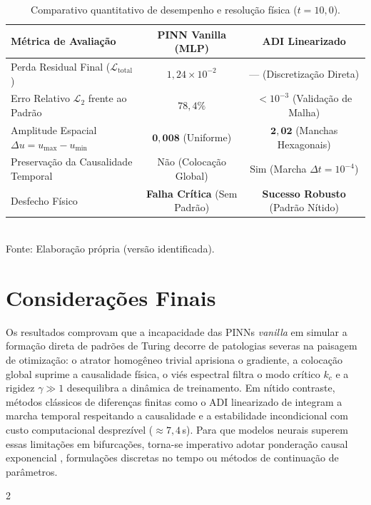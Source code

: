 \documentclass[a4paper, 12pt, twoside]{article}
\begin{document}
\begin{table}[!ht]
  \caption{Comparativo quantitativo de desempenho e resolução física ($t = 10{,}0$).}
  \label{tab:results_summary}
  \centering
  \small{}
  \begin{tabular}{lcc}
    \toprule
    \textbf{Métrica de Avaliação} & \textbf{PINN Vanilla (MLP)} & \textbf{ADI Linearizado \cite{pereira2019}} \\
    \midrule
    Perda Residual Final ($\mathcal{L}_{\mathrm{total}}$) & $1{,}24 \times 10^{-2}$ & --- (Discretização Direta) \\
    Erro Relativo $\mathcal{L}_2$ frente ao Padrão & $78{,}4\%$ & $<\!10^{-3}$ (Validação de Malha) \\
    Amplitude Espacial $\Delta u = u_{\max} - u_{\min}$ & $\mathbf{0{,}008}$ (Uniforme) & $\mathbf{2{,}02}$ (Manchas Hexagonais) \\
    Preservação da Causalidade Temporal & Não (Colocação Global) & Sim (Marcha $\Delta t = 10^{-4}$) \\
    Desfecho Físico & \textbf{Falha Crítica} (Sem Padrão) & \textbf{Sucesso Robusto} (Padrão Nítido) \\
    \bottomrule
  \end{tabular}\\[2pt]
  {\footnotesize Fonte: Elaboração própria (versão identificada).}
\end{table}


\section{Considerações Finais}

Os resultados comprovam que a incapacidade das PINNs \textit{vanilla} em simular a formação
direta de padrões de Turing decorre de patologias severas na paisagem de otimização: o atrator homogêneo trivial aprisiona o gradiente, a colocação global suprime a causalidade física, o viés espectral filtra o modo crítico $k_c$ e a rigidez $\gamma \gg 1$ desequilibra a dinâmica de treinamento.
Em nítido contraste, métodos clássicos de diferenças finitas como o ADI linearizado de
\textcite{pereira2019} integram a marcha temporal respeitando a causalidade e a estabilidade
incondicional com custo computacional desprezível ($\approx 7{,}4$\,s). Para que modelos neurais
superem essas limitações em bifurcações, torna-se imperativo adotar ponderação causal exponencial \cite{wang2022causality}, formulações discretas no tempo ou métodos de continuação de parâmetros.


\setlength{\bibitemsep}{0.8pt}
\begin{multicols}{2}
{\scriptsize\printbibliography[title={Referências}]}
\end{multicols}
\end{document}
